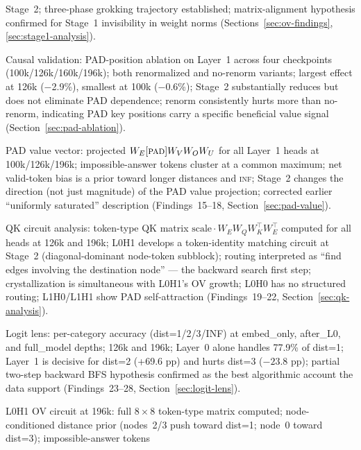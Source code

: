 \documentclass[11pt, a4paper]{article}
\begin{document}
\begin{description}
\begin{description}
        Stage~2; three-phase grokking trajectory established; matrix-alignment
        hypothesis confirmed for Stage~1 invisibility in weight norms
        (Sections~\ref{sec:ov-findings}, \ref{sec:stage1-analysis}).
      \item[3.4 (Done)] Causal validation: PAD-position ablation on Layer~1
        across four checkpoints (100k/126k/160k/196k); both renormalized and
        no-renorm variants; largest effect at 126k ($-$2.9\%), smallest at
        100k ($-$0.6\%); Stage~2 substantially reduces but does not eliminate PAD
        dependence; renorm consistently hurts more than no-renorm, indicating
        PAD key positions carry a specific beneficial value signal
        (Section~\ref{sec:pad-ablation}).
      \item[3.5 (Done)] PAD value vector: projected $W_E[\textsc{pad}] W_V W_O W_U$
        for all Layer~1 heads at 100k/126k/196k; impossible-answer tokens cluster
        at a common maximum; net valid-token bias is a prior toward longer distances
        and \textsc{inf}; Stage~2 changes the direction (not just magnitude) of the
        PAD value projection; corrected earlier ``uniformly saturated'' description
        (Findings~15--18, Section~\ref{sec:pad-value}).
      \item[3.6 (Done)] QK circuit analysis: token-type QK matrix
        $\text{scale} \cdot W_E W_Q W_K^\top W_E^\top$ computed for all heads
        at 126k and 196k; L0H1 develops a token-identity matching circuit at
        Stage~2 (diagonal-dominant node-token subblock); routing interpreted as
        ``find edges involving the destination node'' --- the backward search
        first step; crystallization is simultaneous with L0H1's OV growth;
        L0H0 has no structured routing; L1H0/L1H1 show PAD self-attraction
        (Findings~19--22, Section~\ref{sec:qk-analysis}).
      \item[3.7 (Done)] Logit lens: per-category accuracy (dist=1/2/3/INF) at
        embed\_only, after\_L0, and full\_model depths; 126k and 196k;
        Layer~0 alone handles 77.9\% of dist=1; Layer~1 is decisive for
        dist=2 (+69.6 pp) and hurts dist=3 ($-23.8$ pp); partial
        two-step backward BFS hypothesis confirmed as the best algorithmic
        account the data support (Findings~23--28,
        Section~\ref{sec:logit-lens}).
      \item[3.8 (Done)] L0H1 OV circuit at 196k: full $8 \times 8$ token-type
        matrix computed; node-conditioned distance prior (nodes~2/3 push
        toward dist=1; node~0 toward dist=3); impossible-answer tokens

\end{description}
\end{description}
\end{document}
